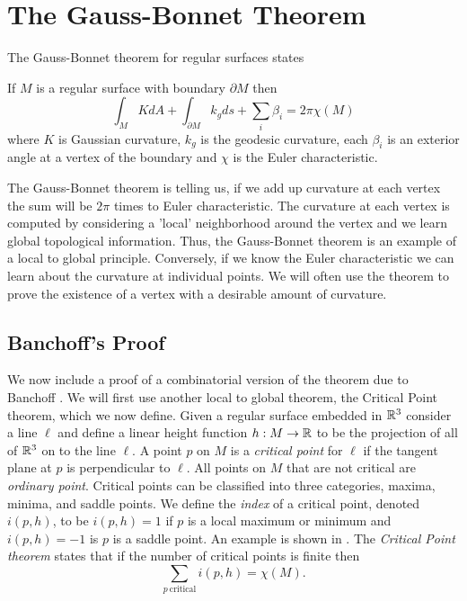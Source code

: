 \section{The Gauss-Bonnet Theorem}



The Gauss-Bonnet theorem for regular surfaces states

\begin{theorem} \label{thm:g-b-c}

If $M$ is a regular surface with boundary $\partial M$ then
	$$\int_{M} K dA+ \int_{\partial M} k_g ds + \sum_i \beta_i= 2\pi \chi(M)$$
	where  $K$ is Gaussian curvature,
	 $k_g$ is the geodesic curvature,
	 each $\beta_i$  is an exterior angle at a vertex of the boundary and
	$\chi$ is the Euler characteristic.
\end{theorem}


The  Gauss-Bonnet theorem is  telling us, if we add up curvature
at each vertex the sum will be $2\pi$ times to Euler characteristic.
The curvature at each vertex is computed by considering a 'local' neighborhood
around the vertex and we learn global topological information. Thus, the Gauss-Bonnet 
theorem is an example of a local to global principle. 
Conversely, if we know the Euler characteristic we can learn about the curvature
at individual points. We will often use the theorem to prove the existence of
a vertex with a desirable amount of curvature.



\subsection{Banchoff's Proof}
We now include a proof of a combinatorial version of the theorem due to Banchoff
\cite{banchoff_critical_1970}. We will first use another local to global theorem,
the Critical Point theorem, which we now define.
Given a regular surface embedded in $\mathbb{R}^3$ consider a line $\ell$ and define a linear height function $h:M \to \mathbb{R}$
to be the projection of all of $\mathbb{R}^3$ on to the line $\ell$. A point $p$ on $M$
is a \emph{critical point} for $\ell$ if the tangent plane at $p$ is perpendicular to $\ell$.
All points on $M$ that are not critical are \emph{ordinary point}.
Critical points can be classified into three categories, maxima, minima, and saddle points.
We define the \emph{index} of a critical point, denoted $i(p,h)$, to be 
$i(p,h)=1$ if $p$ is a  local maximum or minimum and $i(p,h)=-1$ is $p$ is a saddle point.
An example is shown in .
The \emph{Critical  Point theorem} states that if the number of critical points is finite
then 
\begin{equation} \label{eqn:critical-point-theorem}
	\sum_{p\ \textrm{critical}} i(p,h)=\chi(M).
\end{equation}

